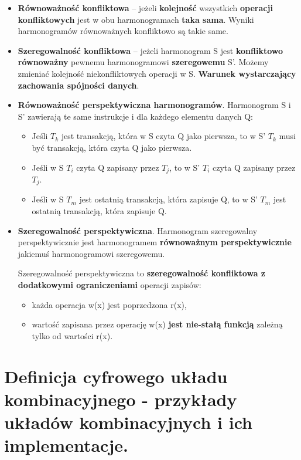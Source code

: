 \documentclass[main.tex]{subfiles}
\begin{document}
    \begin{itemize}
        \item \textbf{Równoważność konfliktowa} -- jeżeli \textbf{kolejność} wszystkich \textbf{operacji konfliktowych}
        jest w obu harmonogramach \textbf{taka sama}. Wyniki harmonogramów równoważnych konfliktowo są takie same.
        \item \textbf{Szeregowalność konfliktowa} -- jeżeli harmonogram S jest \textbf{konfliktowo równoważny} pewnemu
        harmonogramowi \textbf{szeregowemu} S’. Możemy zmieniać kolejność niekonfliktowych operacji w S.
        \textbf{Warunek wystarczający zachowania spójności danych}.\\

        \item \textbf{Równoważność perspektywiczna harmonogramów}. Harmonogram S i S' zawierają te same instrukcje i dla każdego
        elementu danych Q:
        \begin{itemize}
            \item Jeśli $T_k$ jest transakcją, która w
            S czyta Q jako pierwsza, to w S' $T_k$ musi być transakcją, która czyta Q jako pierwsza.
            \item Jeśli w S $T_i$ czyta Q zapisany przez $T_j$, to w S' $T_i$ czyta Q zapisany przez $T_j$.
            \item Jeśli w S  $T_m$ jest ostatnią transakcją, która
            zapisuje Q, to w S' $T_m$ jest ostatnią transakcją, która zapisuje Q.
        \end{itemize}

        \item \textbf{Szeregowalność perspektywiczna}. Harmonogram szeregowalny perspektywicznie jest harmonogramem
        \textbf{równoważnym perspektywicznie} jakiemuś harmonogramowi szeregowemu.

        Szeregowalność perspektywiczna to \textbf{szeregowalność konfliktowa z dodatkowymi ograniczeniami} operacji zapisów:
        \begin{itemize}
            \item każda operacja w(x) jest poprzedzona r(x),
            \item wartość zapisana przez operację w(x) \textbf{jest nie-stałą funkcją} zależną tylko od wartości r(x).
        \end{itemize}
    \end{itemize}


    \section{Definicja cyfrowego układu kombinacyjnego - przykłady układów kombinacyjnych i ich implementacje.}
\end{document}
